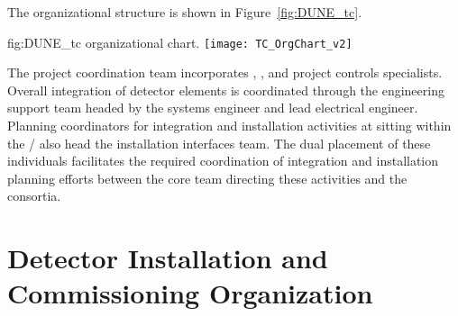 The   organizational structure is shown 
in Figure~\ref{fig:DUNE_tc}.  

\begin{dunefigure}{fig:DUNE_tc}
  {  organizational chart.}
  \texttt{[image: TC\_OrgChart\_v2]}
\end{dunefigure}

The  project coordination team incorporates , 
, and project controls specialists.  Overall integration 
of  detector elements is coordinated through the  
engineering support team headed by the  systems 
engineer and lead  electrical engineer.  Planning 
coordinators for integration and installation activities at 
 sitting within the /  also head the  installation interfaces team.  
The dual placement of these individuals facilitates the required 
coordination of integration and installation planning efforts between 
the core team directing these activities and the  
consortia. 

                                          \begin{comment}  %
The \dword{dune} project has already completed an initial round of design 
and prototyping culminating in the construction and operation 
of the \dword{protodune} detectors.  Moving forward, the project is 
updating detector component designs to incorporate lessons learned from 
the \dword{protodune} experience.  Then the designs are final, the 
project will first construct production versions of all components to be installed and operated in a second phase of \dword{protodune} 
operations before starting full-scale production.  The operation 
of each \dword{protodune2} detector will begin roughly two years after
the end of operations for its corresponding \dword{protodune} detector.
In a few cases, production of components requiring a long lead time must 
be started in parallel with the operation of first production components 
in \dword{protodune2}.
                                          \end{comment}  %

\section{Detector Installation and Commissioning Organization}
\label{sec:es-tc-det-instal}

